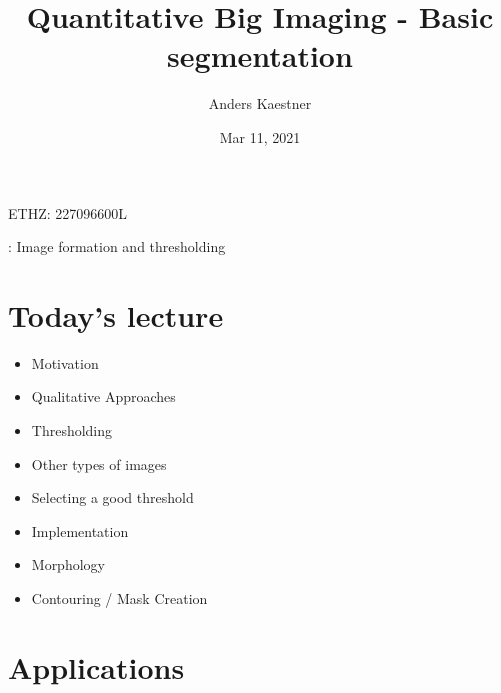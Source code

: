 \documentclass[letterpaper,10pt,english]{sphinxmanual}
\title{Quantitative Big Imaging - Basic segmentation}
\date{Mar 11, 2021}
\author{Anders Kaestner}
\begin{document}
\pagestyle{empty}
\sphinxmaketitle
\pagestyle{plain}
\sphinxtableofcontents
\pagestyle{normal}
\label{\detokenize{04-BasicSegmentation::doc}}




\sphinxAtStartPar
{} ETHZ: 227\sphinxhyphen{}0966\sphinxhyphen{}00L

\sphinxAtStartPar
{}: Image formation and thresholding






\chapter{Today’s lecture}
\label{\detokenize{04-BasicSegmentation:today-s-lecture}}\begin{itemize}
\item {} 
\sphinxAtStartPar
Motivation

\item {} 
\sphinxAtStartPar
Qualitative Approaches

\item {} 
\sphinxAtStartPar
Thresholding

\item {} 
\sphinxAtStartPar
Other types of images

\item {} 
\sphinxAtStartPar
Selecting a good threshold

\item {} 
\sphinxAtStartPar
Implementation

\item {} 
\sphinxAtStartPar
Morphology

\item {} 
\sphinxAtStartPar
Contouring / Mask Creation

\end{itemize}


\chapter{Applications}
\label{\detokenize{04-BasicSegmentation:applications}}
\end{document}
